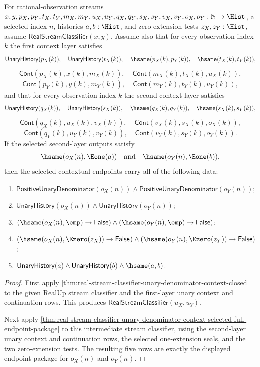 \begin{theorem}
\label{thm:real-stream-classifier-iterated-unary-context-selected-full-endpoint-package}
For rational-observation streams
$x,y,p_X,p_Y,t_X,t_Y,m_X,m_Y,u_X,u_Y,q_X,q_Y,s_X,s_Y,v_X,v_Y,o_X,o_Y:
\mathbb{N}\to\Hist$, a selected index $n$, histories $a,b:\Hist$, and
zero-extension tests $z_X,z_Y:\Hist$, assume
$\mathsf{RealStreamClassifier}(x,y)$. Assume also that for every observation
index $k$ the first context layer satisfies
$$
\mathsf{UnaryHistory}(p_X(k)),\quad \mathsf{UnaryHistory}(t_X(k)),\quad
\hsame(p_X(k),p_Y(k)),\quad \hsame(t_X(k),t_Y(k)),
$$
$$
\mathsf{Cont}(p_X(k),x(k),m_X(k)),\quad
\mathsf{Cont}(m_X(k),t_X(k),u_X(k)),
$$
$$
\mathsf{Cont}(p_Y(k),y(k),m_Y(k)),\quad
\mathsf{Cont}(m_Y(k),t_Y(k),u_Y(k)),
$$
and that for every observation index $k$ the second context layer satisfies
$$
\mathsf{UnaryHistory}(q_X(k)),\quad \mathsf{UnaryHistory}(s_X(k)),\quad
\hsame(q_X(k),q_Y(k)),\quad \hsame(s_X(k),s_Y(k)),
$$
$$
\mathsf{Cont}(q_X(k),u_X(k),v_X(k)),\quad
\mathsf{Cont}(v_X(k),s_X(k),o_X(k)),
$$
$$
\mathsf{Cont}(q_Y(k),u_Y(k),v_Y(k)),\quad
\mathsf{Cont}(v_Y(k),s_Y(k),o_Y(k)).
$$
If the selected second-layer outputs satisfy
$$
\hsame(o_X(n),\Eone(a))\quad\text{and}\quad \hsame(o_Y(n),\Eone(b)),
$$
then the selected contextual endpoints carry all of the following data:
\begin{enumerate}
\item $\mathsf{PositiveUnaryDenominator}(o_X(n))\land
\mathsf{PositiveUnaryDenominator}(o_Y(n))$;
\item $\mathsf{UnaryHistory}(o_X(n))\land \mathsf{UnaryHistory}(o_Y(n))$;
\item $(\hsame(o_X(n),\emp)\to\mathsf{False})\land
(\hsame(o_Y(n),\emp)\to\mathsf{False})$;
\item $(\hsame(o_X(n),\Ezero(z_X))\to\mathsf{False})\land
(\hsame(o_Y(n),\Ezero(z_Y))\to\mathsf{False})$;
\item $\mathsf{UnaryHistory}(a)\land\mathsf{UnaryHistory}(b)\land\hsame(a,b)$.
\end{enumerate}
\end{theorem}
\begin{proof}
First apply
\autoref{thm:real-stream-classifier-unary-denominator-context-closed} to the
given RealUp stream classifier and the first-layer unary context and
continuation rows. This produces $\mathsf{RealStreamClassifier}(u_X,u_Y)$.

Next apply
\autoref{thm:real-stream-classifier-unary-denominator-context-selected-full-endpoint-package}
to this intermediate stream classifier, using the second-layer unary context
and continuation rows, the selected one-extension seals, and the two
zero-extension tests. The resulting five rows are exactly the displayed
endpoint package for $o_X(n)$ and $o_Y(n)$.
\end{proof}

